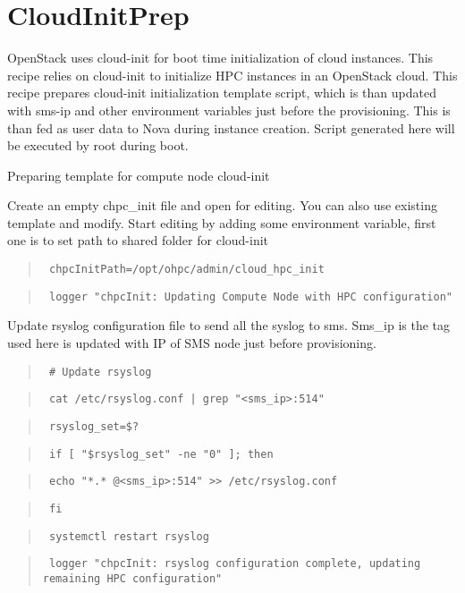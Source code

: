 \documentclass[12pt]{article}
\begin{document}
	\newenvironment{bash}
	{\begin{quote}
		}
		{
		\end{quote}
	}
\section[]{CloudInitPrep}

OpenStack uses cloud-init for boot time initialization of cloud instances. This recipe relies on cloud-init to initialize HPC instances in an OpenStack cloud. This recipe prepares cloud-init initialization template script, which is than updated with sms-ip and other environment variables just before the provisioning. This is than fed as user data to Nova during instance creation. Script generated here will be executed by root during boot.

Preparing template for compute node cloud-init

Create an empty chpc\_init file and open for editing. You can also use existing template and modify.
Start editing by adding some environment variable, first one is to set path to shared folder for cloud-init

\begin{bash}\texttt{\small{ chpcInitPath=/opt/ohpc/admin/cloud\_hpc\_init}}\end{bash}
\begin{bash}\texttt{\small{ logger "chpcInit: Updating Compute Node with HPC configuration"}}\end{bash}

Update rsyslog configuration file to send all the syslog to sms. Sms\_ip is the tag used here is updated with IP of SMS node just before provisioning.

\begin{bash}\texttt{\small{ \# Update rsyslog}}\end{bash}
\begin{bash}\texttt{\small{ cat /etc/rsyslog.conf | grep "<sms\_ip>:514"}}\end{bash}
\begin{bash}\texttt{\small{ rsyslog\_set=\$?}}\end{bash}
\begin{bash}\texttt{\small{ if [ "\${rsyslog\_set}" -ne "0" ]; then}}\end{bash}
\begin{bash}\texttt{\small{     echo "*.* @<sms\_ip>:514" >> /etc/rsyslog.conf}}\end{bash}
\begin{bash}\texttt{\small{ fi}}\end{bash}
\begin{bash}\texttt{\small{ systemctl restart rsyslog}}\end{bash}
\begin{bash}\texttt{\small{ logger "chpcInit: rsyslog configuration complete, updating remaining HPC configuration"}}\end{bash}
\end{document}
